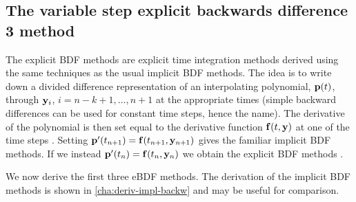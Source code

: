 \subsection{The variable step explicit backwards difference 3 method}

The explicit BDF methods are explicit time integration methods derived using the same techniques as the usual implicit BDF methods.
The idea is to write down a divided difference representation of an interpolating polynomial, ${\mathbf{p}}(t)$, through $\mathbf{y}_i$, $i=n-k+1, \ldots, n+1$ at the appropriate times (simple backward differences can be used for constant time steps, hence the name).
The derivative of the polynomial is then set equal to the derivative function ${\mathbf{f}{\left( t, \mathbf{y} \right)}}$ at one of the time steps \cite[pg. 400]{HairerNorsettWanner}.
Setting ${\mathbf{p}}'(t_{n+1}) = {\mathbf{f}{\left( t_{n+1}, \mathbf{y}_{n+1} \right)}}$ gives the familiar implicit BDF methods.
If we instead ${\mathbf{p}}'(t_{n}) = {\mathbf{f}{\left( t_{n}, \mathbf{y}_{n} \right)}}$ we obtain the explicit BDF methods \cite[pg. 364]{HairerNorsettWanner}.

We now derive the first three eBDF methods.
The derivation of the implicit BDF methods is shown in \autoref{cha:deriv-impl-backw} and may be useful for comparison.

